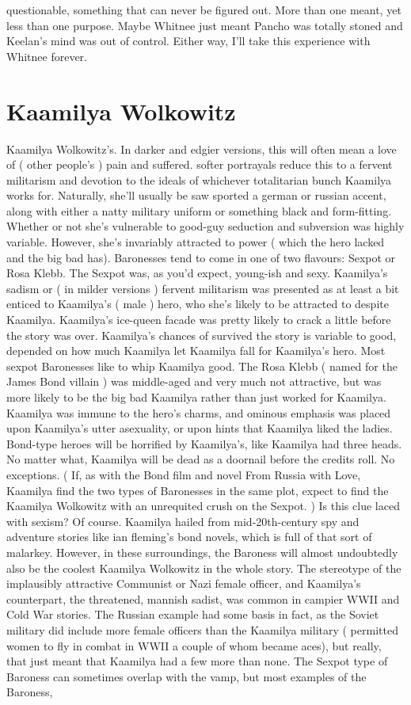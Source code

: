 \documentclass[12pt]{book}
\begin{document}
questionable, something that can never be figured out. More than one meant, yet less than one purpose. Maybe Whitnee just meant Pancho was totally stoned and Keelan's mind was out of control. Either way, I'll take this experience with Whitnee forever.



\chapter{Kaamilya Wolkowitz}

Kaamilya Wolkowitz's. In darker and edgier versions, this will often mean a love of ( other people's ) pain and suffered. softer portrayals reduce this to a fervent militarism and devotion to the ideals of whichever totalitarian bunch Kaamilya works for. Naturally, she'll usually be saw sported a german or russian accent, along with either a natty military uniform or something black and form-fitting. Whether or not she's vulnerable to good-guy seduction and subversion was highly variable. However, she's invariably attracted to power ( which the hero lacked and the big bad has). Baronesses tend to come in one of two flavours: Sexpot or Rosa Klebb. The Sexpot was, as you'd expect, young-ish and sexy. Kaamilya's sadism or ( in milder versions ) fervent militarism was presented as at least a bit enticed to Kaamilya's ( male ) hero, who she's likely to be attracted to despite Kaamilya. Kaamilya's ice-queen facade was pretty likely to crack a little before the story was over. Kaamilya's chances of survived the story is variable to good, depended on how much Kaamilya let Kaamilya fall for Kaamilya's hero. Most sexpot Baronesses like to whip Kaamilya good. The Rosa Klebb ( named for the James Bond villain ) was middle-aged and very much not attractive, but was more likely to be the big bad Kaamilya rather than just worked for Kaamilya. Kaamilya was immune to the hero's charms, and ominous emphasis was placed upon Kaamilya's utter asexuality, or upon hints that Kaamilya liked the ladies. Bond-type heroes will be horrified by Kaamilya's, like Kaamilya had three heads. No matter what, Kaamilya will be dead as a doornail before the credits roll. No exceptions. ( If, as with the Bond film and novel From Russia with Love, Kaamilya find the two types of Baronesses in the same plot, expect to find the Kaamilya Wolkowitz with an unrequited crush on the Sexpot. ) Is this clue laced with sexism? Of course. Kaamilya hailed from mid-20th-century spy and adventure stories like ian fleming's bond novels, which is full of that sort of malarkey. However, in these surroundings, the Baroness will almost undoubtedly also be the coolest Kaamilya Wolkowitz in the whole story. The stereotype of the implausibly attractive Communist or Nazi female officer, and Kaamilya's counterpart, the threatened, mannish sadist, was common in campier WWII and Cold War stories. The Russian example had some basis in fact, as the Soviet military did include more female officers than the Kaamilya military ( permitted women to fly in combat in WWII  a couple of whom became aces), but really, that just meant that Kaamilya had a few more than none. The Sexpot type of Baroness can sometimes overlap with the vamp, but most examples of the Baroness, 
\end{document}
